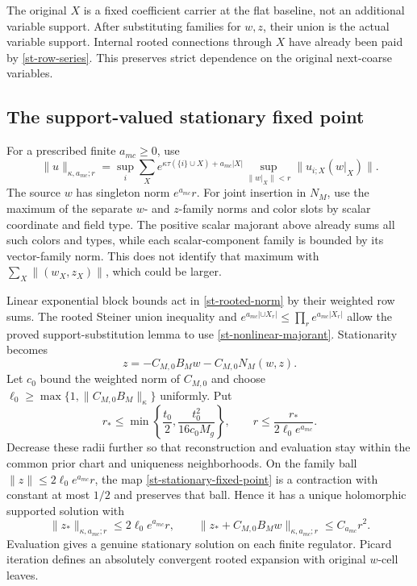 \documentclass[11pt]{article}
\theoremstyle{remark}\newtheorem{remark}[theorem]{Remark}
\begin{document}
The original $X$ is a fixed coefficient carrier at the flat baseline,
not an additional variable support. After substituting families for
$w,z$, their union is the actual variable support. Internal rooted
connections through $X$ have already been paid by
\eqref{st-row-series}. This preserves strict dependence on the original
next-coarse variables.

\subsection{The support-valued stationary fixed point}
\label{st-contraction-section}

For a prescribed finite $a_{
m c}\ge0$, use
\begin{equation}
 \|u\|_{\kappa,a_{
m c};r}
 =\sup_i\sum_X e^{\kappa\tau(\{i\}\cup X)+a_{
m c}|X|}
             \sup_{\|w|_X\|<r}\|u_{i;X}(w|_X)\|.            \label{st-rooted-norm}
\end{equation}
The source $w$ has singleton norm $e^{a_{
m c}}r$. For joint insertion
in $N_M$, use the maximum of the separate $w$- and $z$-family norms and
color slots by scalar coordinate and field type. The positive scalar
majorant above already sums all such colors and types, while each
scalar-component family is bounded by its vector-family norm. This
does not identify that maximum with
$\sum_X\|(w_X,z_X)\|$, which could be larger.

Linear exponential block bounds act in \eqref{st-rooted-norm} by their
weighted row sums. The rooted Steiner union inequality and
$e^{a_{
m c}|\cup X_r|}\le\prod_r e^{a_{
m c}|X_r|}$ allow the
proved support-substitution lemma to use
\eqref{st-nonlinear-majorant}. Stationarity becomes
\begin{equation}
 z=-C_{M,0}B_Mw-C_{M,0}N_M(w,z).                            \label{st-stationary-fixed-point}
\end{equation}
Let $c_0$ bound the weighted norm of $C_{M,0}$ and choose
$\ell_0\ge\max\{1,\|C_{M,0}B_M\|_\kappa\}$ uniformly. Put
\begin{equation}
 r_*\le\min\left\{\frac{t_0}{2},
                  \frac{t_0^2}{16c_0M_g}\right\},\qquad
 r\le\frac{r_*}{2\ell_0e^{a_{
m c}}}.                     \label{st-data-radius}
\end{equation}
Decrease these radii further so that reconstruction and evaluation stay
within the common prior chart and uniqueness neighborhoods. On the
family ball $\|z\|\le2\ell_0e^{a_{
m c}}r$, the map
\eqref{st-stationary-fixed-point} is a contraction with constant at most
$1/2$ and preserves that ball. Hence it has a unique holomorphic
supported solution with
\begin{equation}
 \|z_*\|_{\kappa,a_{
m c};r}\le2\ell_0e^{a_{
m c}}r,
 \qquad
 \|z_*+C_{M,0}B_Mw\|_{\kappa,a_{
m c};r}\le C_{a_{
m c}}r^2.
                                                               \label{st-retained-support}
\end{equation}
Evaluation gives a genuine stationary solution on each finite
regulator. Picard iteration defines an absolutely convergent rooted
expansion with original $w$-cell leaves.
\end{document}
